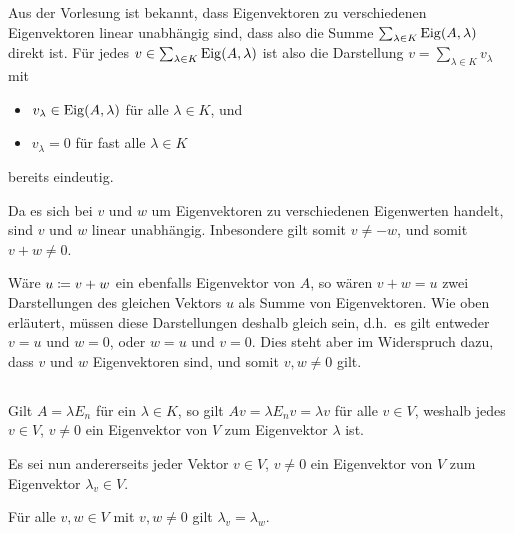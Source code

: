 \section{}





\subsection{}

Aus der Vorlesung ist bekannt, dass Eigenvektoren zu verschiedenen Eigenvektoren linear unabhängig sind, dass also die Summe $\sum_{\lambda \in K} \operatorname{Eig}(A, \lambda)$ direkt ist.
Für jedes $v \in \sum_{\lambda \in K} \operatorname{Eig}(A, \lambda)$ ist also die Darstellung $v = \sum_{\lambda \in K} v_\lambda$ mit
\begin{itemize}
  \item
    $v_{\lambda} \in \operatorname{Eig}(A, \lambda)$ für alle $\lambda \in K$, und
  \item
    $v_\lambda = 0$ für fast alle $\lambda \in K$
\end{itemize}
bereits eindeutig.

Da es sich bei $v$ und $w$ um Eigenvektoren zu verschiedenen Eigenwerten handelt, sind $v$ und $w$ linear unabhängig.
Inbesondere gilt somit $v \neq -w$, und somit $v + w \neq 0$.

Wäre $u \coloneqq v + w$ ein ebenfalls Eigenvektor von $A$, so wären $v + w = u$ zwei Darstellungen des gleichen Vektors $u$ als Summe von Eigenvektoren.
Wie oben erläutert, müssen diese Darstellungen deshalb gleich sein, d.h.\ es gilt entweder $v = u$ und $w = 0$, oder $w = u$ und $v = 0$.
Dies steht aber im Widerspruch dazu, dass $v$ und $w$ Eigenvektoren sind, und somit $v, w \neq 0$ gilt.





\subsection{}

Gilt $A = \lambda E_n$ für ein $\lambda \in K$, so gilt $Av = \lambda E_n v = \lambda v$ für alle $v \in V$, weshalb jedes $v \in V$, $v \neq 0$ ein Eigenvektor von $V$ zum Eigenvektor $\lambda$ ist.

Es sei nun andererseits jeder Vektor $v \in V$, $v \neq 0$ ein Eigenvektor von $V$ zum Eigenvektor $\lambda_v \in V$.

\begin{claim*}
  Für alle $v, w \in V$ mit $v, w \neq 0$ gilt $\lambda_v = \lambda_w$.
\end{claim*}

